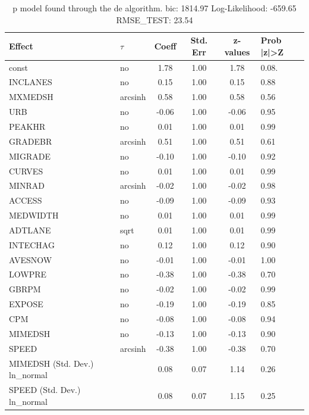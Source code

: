 \begin{table}
	\caption{p model found through the de algorithm. bic: 1814.97 Log-Likelihood: -659.65 RMSE_TEST: 23.54}
	\begin{center}
		\begin{tabular}{|l|l|c|c|c|l|}
			\hline
			Effect & $\tau$ & Coeff & Std. Err & z-values & Prob |z|>Z \\
			\hline
			const & no & 1.78 & 1.00 & 1.78 & 0.08. \\
			\hline
			INCLANES & no & 0.15 & 1.00 & 0.15 & 0.88 \\
			\hline
			MXMEDSH & arcsinh & 0.58 & 1.00 & 0.58 & 0.56 \\
			\hline
			URB & no & -0.06 & 1.00 & -0.06 & 0.95 \\
			\hline
			PEAKHR & no & 0.01 & 1.00 & 0.01 & 0.99 \\
			\hline
			GRADEBR & arcsinh & 0.51 & 1.00 & 0.51 & 0.61 \\
			\hline
			MIGRADE & no & -0.10 & 1.00 & -0.10 & 0.92 \\
			\hline
			CURVES & no & 0.01 & 1.00 & 0.01 & 0.99 \\
			\hline
			MINRAD & arcsinh & -0.02 & 1.00 & -0.02 & 0.98 \\
			\hline
			ACCESS & no & -0.09 & 1.00 & -0.09 & 0.93 \\
			\hline
			MEDWIDTH & no & 0.01 & 1.00 & 0.01 & 0.99 \\
			\hline
			ADTLANE & sqrt & 0.01 & 1.00 & 0.01 & 0.99 \\
			\hline
			INTECHAG & no & 0.12 & 1.00 & 0.12 & 0.90 \\
			\hline
			AVESNOW & no & -0.01 & 1.00 & -0.01 & 1.00 \\
			\hline
			LOWPRE & no & -0.38 & 1.00 & -0.38 & 0.70 \\
			\hline
			GBRPM & no & -0.02 & 1.00 & -0.02 & 0.99 \\
			\hline
			EXPOSE & no & -0.19 & 1.00 & -0.19 & 0.85 \\
			\hline
			CPM & no & -0.08 & 1.00 & -0.08 & 0.94 \\
			\hline
			MIMEDSH & no & -0.13 & 1.00 & -0.13 & 0.90 \\
			\hline
			SPEED & arcsinh & -0.38 & 1.00 & -0.38 & 0.70 \\
			\hline
			MIMEDSH (Std. Dev.) ln_normal &  & 0.08 & 0.07 & 1.14 & 0.26 \\
			\hline
			SPEED (Std. Dev.) ln_normal &  & 0.08 & 0.07 & 1.15 & 0.25 \\
			\hline
		\end{tabular}
	\end{center}
\end{table}